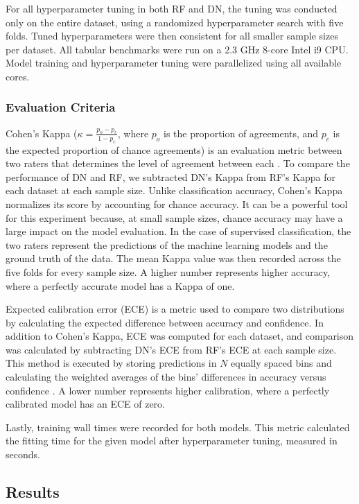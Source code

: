For all hyperparameter tuning in both RF and DN, the tuning was conducted only on the entire dataset, using a randomized hyperparameter search with five folds. Tuned hyperparameters were then consistent for all smaller sample sizes per dataset. All tabular benchmarks were run on a 2.3 GHz 8-core Intel i9 CPU. Model training and hyperparameter tuning were parallelized using all available cores.

\subsubsection{Evaluation Criteria}
Cohen's Kappa ($\kappa = \frac{p_o - p_c}{1 - p_c}$, where $p_o$ is the proportion of agreements, and $p_c$ is the expected proportion of chance agreements) is an evaluation metric between two raters that determines the level of agreement between each \citep{cohen}.
To compare the performance of DN and RF, we subtracted DN's Kappa from RF's Kappa for each dataset at each sample size. Unlike classification accuracy, Cohen's Kappa normalizes its score by accounting for chance accuracy. It can be a powerful tool for this experiment because, at small sample sizes, chance accuracy may have a large impact on the model evaluation. In the case of supervised classification, the two raters represent the predictions of the machine learning models and the ground truth of the data. The mean Kappa value was then recorded across the five folds for every sample size. A higher number represents higher accuracy, where a perfectly accurate model has a Kappa of one.

Expected calibration error (ECE) is a metric used to compare two distributions by calculating the expected difference between accuracy and confidence. In addition to Cohen's Kappa, ECE was computed for each dataset, and comparison was calculated by subtracting DN's ECE from RF's ECE at each sample size. This method is executed by storing predictions in $N$ equally spaced bins and calculating the weighted averages of the bins' differences in accuracy versus confidence \citep{pmlr-v70-guo17a}.
A lower number represents higher calibration, where a perfectly calibrated model has an ECE of zero.

Lastly, training wall times were recorded for both models. This metric calculated the fitting time for the given model after hyperparameter tuning, measured in seconds.

\subsection{Results}
